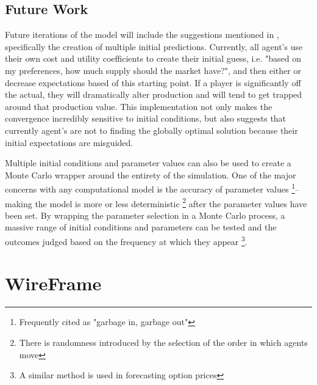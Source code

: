 \documentclass[12pt]{article}
\begin{document}
\subsection{Future Work}\label{future}
Future iterations of the model will include the suggestions mentioned in , specifically the creation of multiple initial predictions. Currently, all agent's use their own cost and utility coefficients to create their initial guess, i.e. "based on my preferences, how much supply should the market have?", and then either  or decrease expectations based of this starting point. If a player is significantly off the actual, they will dramatically alter production and will tend to get trapped around that production value. This implementation not only makes the convergence incredibly sensitive to initial conditions, but also suggests that currently agent's are not to finding the globally optimal solution because their initial expectations are misguided. \*

Multiple initial conditions and parameter values can also be used to create a Monte Carlo wrapper around the entirety of the simulation. One of the major concerns with any computational model is the accuracy of parameter values \footnote{Frequently cited as "garbage in, garbage out"}-- making the model is more or less deterministic \footnote{There is randomness introduced by the selection of the order in which agents move} after the parameter values have been set. By wrapping the parameter selection in a Monte Carlo process, a massive range of initial conditions and parameters can be tested and the outcomes judged based on the frequency at which they appear \footnote{A similar method is used in forecasting option prices}. 



\newpage
\appendix

	\section{WireFrame}
\end{document}
